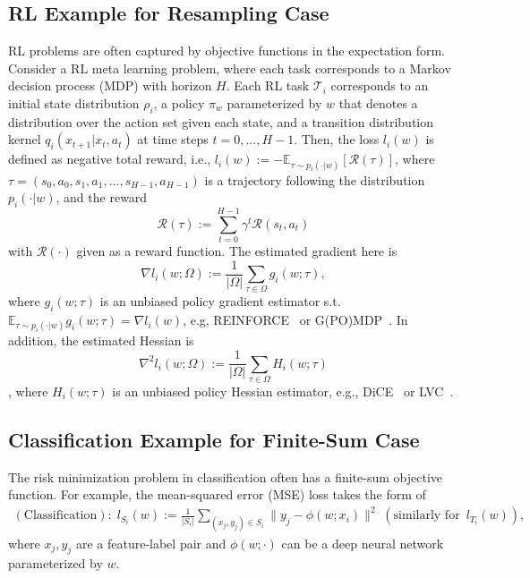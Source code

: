 \documentclass{osudissert96}
\begin{document}
\subsection*{RL Example for Resampling Case}
RL problems are often captured by objective functions in the expectation form. Consider a RL meta learning problem,  where each task  corresponds to  a Markov decision process (MDP) with horizon $H$. Each RL task $\mathcal{T}_i$ corresponds to an initial state distribution $\rho_i$, a policy $\pi_w$ parameterized by $w$ that denotes a distribution over the action set given each state, and a transition distribution kernel $q_i(x_{t+1}|x_t,a_t)$ at time steps $t=0,...,H-1$. Then, the loss $l_i(w)$ is defined as negative total reward, i.e., 
$l_i(w):= -\mathbb{E}_{\tau\sim p_i(\cdot| w)}[ \mathcal{R}(\tau)]$,
where $\tau= (s_0,a_0,s_1,a_1,...,s_{H-1},a_{H-1})$ is a  trajectory following the distribution $p_i(\cdot | w)$, and the reward $$\mathcal{R}(\tau) := \sum_{t=0}^{H-1} \gamma^t\mathcal{R}(s_t,a_t)$$ with $\mathcal{R}(\cdot)$ given as a reward function. The estimated gradient here is  $$\nabla l_i(w; \Omega):= \frac{1}{|\Omega|} \sum_{\tau \in \Omega} g_i(w; \tau),$$ where $g_i(w; \tau)$ is an unbiased policy gradient estimator s.t. $\mathbb{E}_{\tau \sim p_i(\cdot|w)} g_i(w;\tau)= \nabla l_i(w)$, e.g, REINFORCE~\cite{williams1992simple} or G(PO)MDP~\cite{baxter2001infinite}. In addition, the estimated Hessian  is $$\nabla^2 l_i(w; \Omega):= \frac{1}{|\Omega|}\sum_{\tau\in \Omega}H_i(w; \tau)$$, where $H_i(w;\tau)$ is an unbiased policy Hessian estimator, e.g., DiCE~\cite{foerster2018dice} or LVC~\cite{rothfuss2019promp}. 


\subsection*{Classification Example for Finite-Sum Case}
The risk minimization problem in classification often has a finite-sum objective function. For example, the 
mean-squared error (MSE) loss takes the form of  
\begin{align*}
(\text{Classification}):\; l_{S_i}(w):= \frac{1}{|S_i|}\sum_{(x_j, y_j)\in S_i}\|y_j - \phi (w; x_i) \|^2 \;(\text{similarly for } \, l_{T_i}(w)), 
\end{align*}
where $x_j, y_j$ are a feature-label pair and $\phi(w;\cdot)$ can be  a deep neural network parameterized by $w$.
\end{document}
